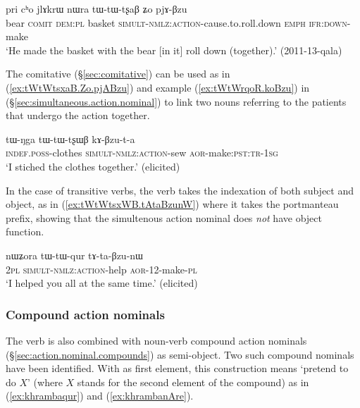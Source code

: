 \begin{exe}
	\ex \label{ex:tWtWtsxaB.Zo.pjABzu}
	\gll  pri cʰo jlɤkrɯ nɯra tɯ-tɯ-tʂaβ ʑo pjɤ-βzu  \\
	bear \textsc{comit} \textsc{dem}:\textsc{pl}  basket  \textsc{simult}-\textsc{nmlz}:\textsc{action}-cause.to.roll.down \textsc{emph} \textsc{ifr}:\textsc{down}-make \\
	\glt `He made the basket with the bear [in it] roll down (together).' (2011-13-qala) 
\end{exe}

The comitative (§\ref{sec:comitative}) can be used as in (\ref{ex:tWtWtsxaB.Zo.pjABzu}) and example  (\ref{ex:tWtWrqoR.koBzu}) in  (§\ref{sec:simultaneous.action.nominal}) to link two nouns referring to the patients that undergo the action together.

\begin{exe}
	\ex \label{ex:tWtWtsxWB.kABzuta}
	\gll   tɯ-ŋga tɯ-tɯ-tʂɯβ kɤ-βzu-t-a \\
	\textsc{indef}.\textsc{poss}-clothes \textsc{simult}-\textsc{nmlz}:\textsc{action}-sew \textsc{aor}-make:\textsc{pst}:\textsc{tr}-\textsc{1sg} \\
	\glt `I stiched the clothes together.' (elicited)
\end{exe}

In the case of transitive verbs, the verb  takes the indexation of both subject and object, as in (\ref{ex:tWtWtsxWB.tAtaBzunW}) where it takes the portmanteau  prefix, showing that the simultenous action nominal does \textit{not} have object function.

\begin{exe}
	\ex \label{ex:tWtWtsxWB.tAtaBzunW}
	\gll nɯʑora tɯ-tɯ-qur tɤ-ta-βzu-nɯ \\
	\textsc{2pl} \textsc{simult}-\textsc{nmlz}:\textsc{action}-help \textsc{aor}-1\fl{}2-make-\textsc{pl} \\
	\glt `I helped you all at the same time.' (elicited)
\end{exe}  


\subsubsection{Compound action nominals} \label{sec:compound.action.nominal.Bzu}
The verb  is also combined with noun-verb compound action nominals (§\ref{sec:action.nominal.compounds}) as semi-object. Two such compound nominals have been identified. With  as first element, this construction means `pretend to do $X$' (where $X$ stands for the second element of the compound) as in (\ref{ex:khrambaqur}) and (\ref{ex:khrambanAre}). 

